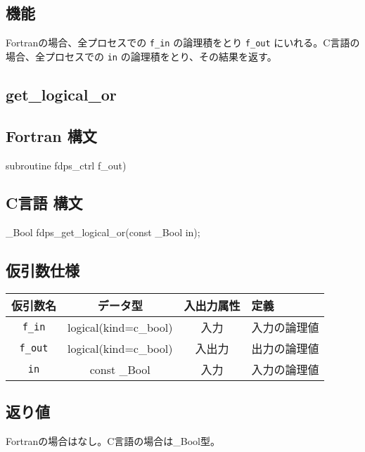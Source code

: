 \subsection*{機能}
Fortranの場合、全プロセスでの \texttt{f\_in} の論理積をとり \texttt{f\_out} にいれる。C言語の場合、全プロセスでの \texttt{in} の論理積をとり、その結果を返す。
\clearpage

\subsection{get\_logical\_or}
\subsection*{Fortran 構文}
\begin{screen}
\begin{spverbatim}
subroutine fdps_ctrl%
                                     f_out)
\end{spverbatim}
\end{screen}

\subsection*{C言語 構文}
\begin{screen}
\begin{spverbatim}
_Bool fdps_get_logical_or(const _Bool in);
\end{spverbatim}
\end{screen}

\subsection*{仮引数仕様}
\begin{table}[h]
\begin{tabularx}{\linewidth}{cccX}
\toprule
\rowcolor{Snow2}
仮引数名 & データ型 & 入出力属性 & 定義 \\
\midrule
\verb|f_in| & logical(kind=c\_bool) & 入力 & 入力の論理値\\
\verb|f_out| & logical(kind=c\_bool) & 入出力 & 出力の論理値\\
\verb|in| & const \_Bool & 入力 & 入力の論理値\\
\bottomrule
\end{tabularx}
\end{table}

\subsection*{返り値}
Fortranの場合はなし。C言語の場合は\_Bool型。

